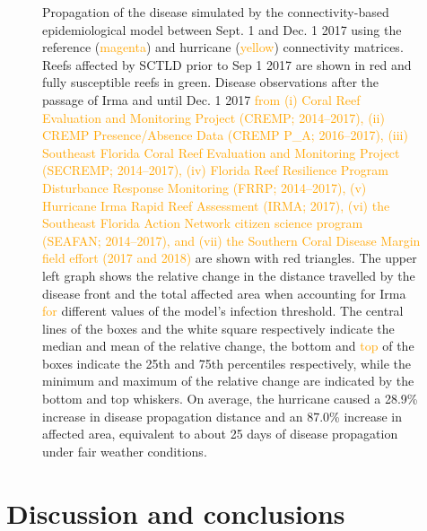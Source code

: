 \documentclass[fleqn,10pt]{wlscirep}
\newcommand{\modif}[1]{\textcolor{orange}{#1}}
\begin{document}
\begin{figure}[tbp]
{        Propagation of the disease simulated by the connectivity-based epidemiological model between Sept. 1 and Dec. 1 2017 using the reference (\modif{magenta}) and hurricane (\modif{yellow}) connectivity matrices. Reefs affected by SCTLD prior to Sep 1 2017 are shown in red and fully susceptible reefs in green. Disease observations after the passage of Irma and until Dec. 1 2017 \modif{from (i) Coral Reef Evaluation and Monitoring Project (CREMP; 2014–2017), (ii) CREMP Presence/Absence Data (CREMP P\_A; 2016–2017), (iii) Southeast Florida Coral Reef Evaluation and Monitoring Project (SECREMP; 2014–2017), (iv) Florida Reef Resilience Program Disturbance Response Monitoring (FRRP; 2014–2017), (v) Hurricane Irma Rapid Reef Assessment (IRMA; 2017), (vi) the Southeast Florida Action Network citizen science program (SEAFAN; 2014–2017), and (vii) the \modif{Southern} Coral Disease Margin field effort (2017 and 2018)} are shown with red triangles. The upper left graph shows the relative change in the distance travelled by the disease front and the total affected area when accounting for Irma \modif{for} different values of the model's infection threshold. The central lines of the boxes and the white square respectively indicate the median and mean of the relative change, the bottom and \modif{top} of the boxes indicate the 25th and 75th percentiles respectively, while the minimum and maximum of the relative change are indicated by the bottom and top whiskers. On average, the hurricane caused  a 28.9\% increase in disease propagation distance and an 87.0\% increase in affected area, equivalent to about 25 days of disease propagation under fair weather conditions.
    }\label{fig:propagation}
\end{figure}

\section{Discussion and conclusions}
\end{document}
